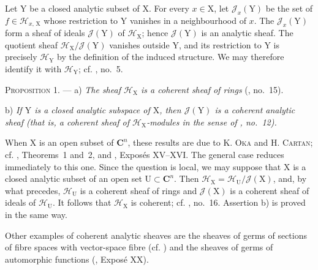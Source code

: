 Let $\mathrm{Y}$ be a closed analytic subset of $\mathrm{X}$. For every $x\in\mathrm{X}$, let $\mathcal{J}_x(\mathrm{Y})$ be the set of $f\in\mathcal{H}_{x,\,\mathrm{X}}$ whose restriction to $\mathrm{Y}$ vanishes in a neighbourhood of $x$. The $\mathcal{J}_x(\mathrm{Y})$ form a sheaf of ideals $\mathcal{J}(\mathrm{Y})$ of $\mathcal{H}_{\mathrm{X}}$; hence $\mathcal{J}(\mathrm{Y})$ is an analytic sheaf. The quotient sheaf $\mathcal{H}_{\mathrm{X}}/\mathcal{J}(\mathrm{Y})$ vanishes outside $\mathrm{Y}$, and its restriction to $\mathrm{Y}$ is precisely $\mathcal{H}_{\mathrm{Y}}$ by the definition of the induced structure. We may therefore identify it with $\mathcal{H}_{\mathrm{Y}}$; cf. , no.~5.

\textsc{Proposition 1}. --- a) \emph{The sheaf $\mathcal{H}_{\mathrm{X}}$ is a coherent sheaf of rings} (, no.~15).

b) \emph{If $\mathrm{Y}$ is a closed analytic subspace of $\mathrm{X}$, then $\mathcal{J}(\mathrm{Y})$ is a coherent analytic sheaf (that is, a coherent sheaf of $\mathcal{H}_{\mathrm{X}}$-modules in the sense of , no.~12).}

When $\mathrm{X}$ is an open subset of $\mathbf{C}^n$, these results are due to K. \textsc{Oka} and H. \textsc{Cartan}; cf. , Theorems~1 and~2, and , Expos\'es XV--XVI. The general case reduces immediately to this one. Since the question is local, we may suppose that $\mathrm{X}$ is a closed analytic subset of an open set $\mathrm{U}\subset\mathbf{C}^n$. Then $\mathcal{H}_{\mathrm{X}}=\mathcal{H}_{\mathrm{U}}/\mathcal{J}(\mathrm{X})$, and, by what precedes, $\mathcal{H}_{\mathrm{U}}$ is a coherent sheaf of rings and $\mathcal{J}(\mathrm{X})$ is a coherent sheaf of ideals of $\mathcal{H}_{\mathrm{U}}$. It follows that $\mathcal{H}_{\mathrm{X}}$ is coherent; cf. , no.~16. Assertion b) is proved in the same way.

Other examples of coherent analytic sheaves are the sheaves of germs of sections of fibre spaces with vector-space fibre (cf. ) and the sheaves of germs of automorphic functions (, Expos\'e XX).


